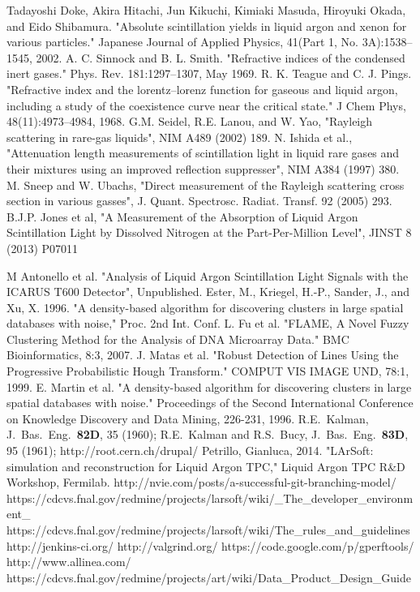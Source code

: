 \documentclass[12pt]{elsarticle}
\begin{document}
\begin{thebibliography}{99}
 Tadayoshi Doke, Akira Hitachi, Jun Kikuchi, Kimiaki Masuda, Hiroyuki Okada, and Eido Shibamura. "Absolute scintillation yields in liquid argon and xenon for various particles." Japanese Journal of Applied Physics, 41(Part 1, No. 3A):1538–1545, 2002.
 A. C. Sinnock and B. L. Smith. "Refractive indices of the condensed inert gases." Phys. Rev. 181:1297–1307, May 1969.   R. K. Teague and C. J. Pings. "Refractive index and the lorentz–lorenz function for gaseous and liquid argon, including a study of the coexistence curve near the critical state." J Chem Phys, 48(11):4973–4984, 1968.
 G.M. Seidel, R.E. Lanou, and W. Yao, "Rayleigh scattering in rare-gas liquids", NIM A489 (2002) 189.   N. Ishida et al., "Attenuation length measurements of scintillation light in liquid rare gases and their mixtures using an improved reflection suppresser", NIM A384 (1997) 380. M. Sneep and W. Ubachs, "Direct measurement of the Rayleigh scattering cross section in various gasses", J. Quant. Spectrosc. Radiat. Transf. 92 (2005) 293.
 B.J.P. Jones et al, "A Measurement of the Absorption of Liquid Argon Scintillation Light by Dissolved Nitrogen at the Part-Per-Million Level", JINST 8 (2013) P07011

 M Antonello et al.  "Analysis of Liquid Argon Scintillation Light Signals with the ICARUS T600 Detector", Unpublished.
 Ester, M., Kriegel, H.-P., Sander, J., and Xu, X. 1996. "A density-based algorithm for discovering clusters in large spatial databases with noise," Proc. 2nd Int. Conf.
 L. Fu et al. "FLAME, A Novel Fuzzy Clustering Method for the Analysis of DNA Microarray Data." BMC Bioinformatics, 8:3, 2007.
 J. Matas et al. "Robust Detection of Lines Using the Progressive Probabilistic Hough Transform." COMPUT VIS IMAGE UND, 78:1, 1999.
 E. Martin et al. "A density-based algorithm for discovering clusters in large spatial databases with noise." Proceedings of the Second International Conference on Knowledge Discovery and Data Mining, 226-231, 1996. 
R.E.~Kalman, J.~Bas.~Eng.~{\bf 82D}, 35 (1960);
R.E.~Kalman and R.S.~Bucy, J.~Bas.~Eng.~{\bf 83D}, 95 (1961);
 http://root.cern.ch/drupal/
 Petrillo, Gianluca, 2014. "LArSoft: simulation and reconstruction for Liquid Argon TPC," Liquid Argon TPC R\&D Workshop, Fermilab.
 http://nvie.com/posts/a-successful-git-branching-model/
 https://cdcvs.fnal.gov/redmine/projects/larsoft/wiki/\_The\_developer\_environment\_
 https://cdcvs.fnal.gov/redmine/projects/larsoft/wiki/The\_rules\_and\_guidelines
 http://jenkins-ci.org/
 http://valgrind.org/
 https://code.google.com/p/gperftools/
 http://www.allinea.com/
 https://cdcvs.fnal.gov/redmine/projects/art/wiki/Data\_Product\_Design\_Guide

\end{thebibliography}
\clearpage 
\end{document}
